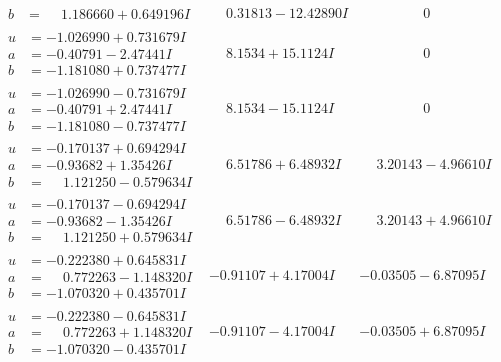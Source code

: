 \documentclass[1p]{elsarticle_modified}
\theoremstyle{definition}
\begin{document}
$$\begin{array}{c|c|c}
\begin{aligned}
b &= \phantom{-}1.186660 + 0.649196 I\end{aligned}
 & \phantom{-}0.31813 - 12.42890 I & \phantom{-0.000000 } 0 \\ \hline\begin{aligned}
u &= -1.026990 + 0.731679 I \\
a &= -0.40791 - 2.47441 I \\
b &= -1.181080 + 0.737477 I\end{aligned}
 & \phantom{-}8.1534 + 15.1124 I & \phantom{-0.000000 } 0 \\ \hline\begin{aligned}
u &= -1.026990 - 0.731679 I \\
a &= -0.40791 + 2.47441 I \\
b &= -1.181080 - 0.737477 I\end{aligned}
 & \phantom{-}8.1534 - 15.1124 I & \phantom{-0.000000 } 0 \\ \hline\begin{aligned}
u &= -0.170137 + 0.694294 I \\
a &= -0.93682 + 1.35426 I \\
b &= \phantom{-}1.121250 - 0.579634 I\end{aligned}
 & \phantom{-}6.51786 + 6.48932 I & \phantom{-}3.20143 - 4.96610 I \\ \hline\begin{aligned}
u &= -0.170137 - 0.694294 I \\
a &= -0.93682 - 1.35426 I \\
b &= \phantom{-}1.121250 + 0.579634 I\end{aligned}
 & \phantom{-}6.51786 - 6.48932 I & \phantom{-}3.20143 + 4.96610 I \\ \hline\begin{aligned}
u &= -0.222380 + 0.645831 I \\
a &= \phantom{-}0.772263 - 1.148320 I \\
b &= -1.070320 + 0.435701 I\end{aligned}
 & -0.91107 + 4.17004 I & -0.03505 - 6.87095 I \\ \hline\begin{aligned}
u &= -0.222380 - 0.645831 I \\
a &= \phantom{-}0.772263 + 1.148320 I \\
b &= -1.070320 - 0.435701 I\end{aligned}
 & -0.91107 - 4.17004 I & -0.03505 + 6.87095 I \\ \hline\begin{aligned}

\end{aligned}
\end{array}$$
\end{document}
